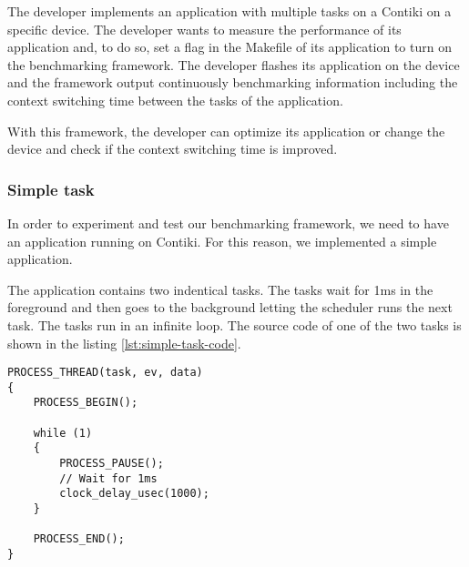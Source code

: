 The developer implements an application with multiple tasks on a Contiki on a specific device.
The developer wants to measure the performance of its application and, to do so, set a flag in the Makefile of its application to turn on the benchmarking framework.
The developer flashes its application on the device and the framework output continuously benchmarking information including the context switching time between the tasks of the application.

With this framework, the developer can optimize its application or change the device and check if the context switching time is improved.

\subsubsection{Simple task}
In order to experiment and test our benchmarking framework, we need to have an application running on Contiki.
For this reason, we implemented a simple application.

The application contains two indentical tasks.
The tasks wait for 1ms in the foreground and then goes to the background letting the scheduler runs the next task.
The tasks run in an infinite loop.
The source code of one of the two tasks is shown in the listing \ref{lst:simple-task-code}.

\begin{lstlisting}[style=CStyle, label={lst:simple-task-code}, caption={Source code of a task implemented in Contiki for the simple application}]
PROCESS_THREAD(task, ev, data)
{
    PROCESS_BEGIN();

    while (1)
    {
        PROCESS_PAUSE();
        // Wait for 1ms
        clock_delay_usec(1000);
    }

    PROCESS_END();
}
\end{lstlisting}